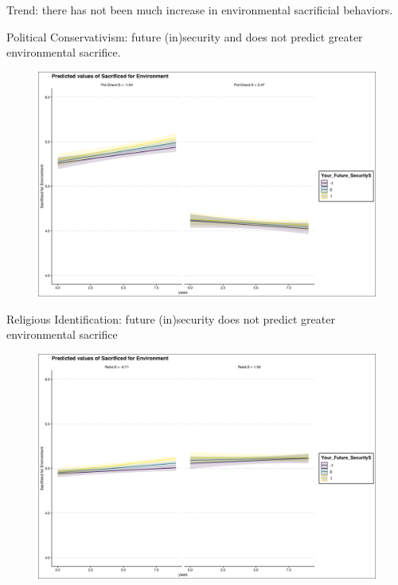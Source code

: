 \documentclass{beamer}
\begin{document}
\begin{frame}{Trend: there has not been much increase in environmental sacrificial behaviors.}
\begin{frame}{Political Conservativism: future (in)security and does not predict greater environmental sacrifice.}
\begin{figure}
\includegraphics[width=.8\textwidth,height=\textheight,keepaspectratio]{Figures/X_SACRIFICEMADE_Your_Future_SecurityS_Pol.Orient.S.png}
\end{figure}
\end{frame}

\begin{frame}{Religious Identification: future (in)security  does not predict greater environmental sacrifice}
\begin{figure}
\includegraphics[width=.8\textwidth,height=\textheight,keepaspectratio]{Figures/X_SACRIFICEMADE_Your_Future_SecurityS_Relid.S.png}
\end{figure}
\end{frame}


\end{frame}
\end{document}
